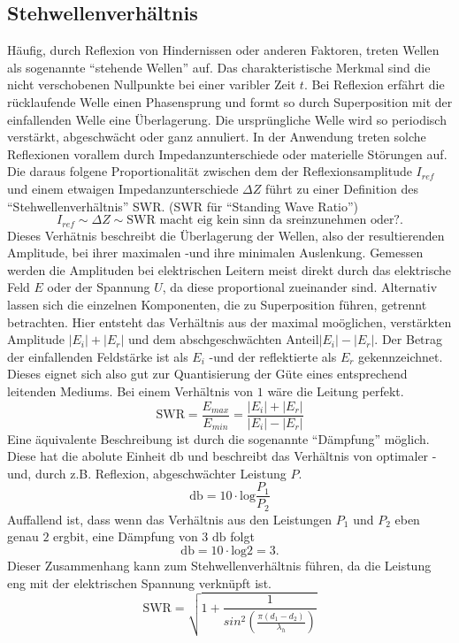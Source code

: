 \subsection{Stehwellenverhältnis}  %
Häufig, durch Reflexion von Hindernissen oder anderen Faktoren, treten Wellen als sogenannte \enquote{stehende Wellen} auf. Das charakteristische Merkmal sind die nicht verschobenen Nullpunkte bei einer varibler Zeit $t$.
Bei Reflexion erfährt die rücklaufende Welle einen Phasensprung und formt so durch Superposition mit der einfallenden Welle eine Überlagerung. Die ursprüngliche Welle wird so periodisch verstärkt, abgeschwächt oder ganz annuliert. 
In der Anwendung treten solche Reflexionen vorallem durch Impedanzunterschiede oder materielle Störungen auf. Die daraus folgene Proportionalität zwischen dem der Reflexionsamplitude $I_{ref}$ und einem etwaigen Impedanzunterschiede $\Delta Z$
führt zu einer Definition des \enquote{Stehwellenverhältnis} SWR. (SWR für \enquote{Standing Wave Ratio}) 
\begin{equation*}
    I_{ref} \sim \Delta Z \sim \text{SWR macht eig kein sinn da sreinzunehmen oder?}.
\end{equation*}
Dieses Verhätnis beschreibt die Überlagerung der Wellen, also der resultierenden Amplitude, bei ihrer maximalen -und ihre minimalen Auslenkung. 
Gemessen werden die Amplituden bei elektrischen Leitern meist direkt durch das elektrische Feld $E$ oder der Spannung $U$, da diese proportional zueinander sind.
Alternativ lassen sich die einzelnen Komponenten, die zu Superposition führen, getrennt betrachten. Hier entsteht das Verhältnis aus der maximal moöglichen, verstärkten Amplitude $|E_i| + |E_r|$ und dem abschgeschwächten Anteil$|E_i| - |E_r|$.
Der Betrag der einfallenden Feldstärke ist als $E_i$ -und der reflektierte als $E_r$ gekennzeichnet. Dieses eignet sich also gut zur Quantisierung der Güte eines entsprechend leitenden Mediums. Bei einem Verhältnis von $1$ wäre die Leitung perfekt.
\begin{equation}
    \text{SWR} = \frac{E_{max}}{E_{min}} =  \frac{|E_i| + |E_r|}{|E_i| - |E_r|}
\end{equation}
Eine äquivalente Beschreibung ist durch die sogenannte \enquote{Dämpfung} möglich. Diese hat die abolute Einheit $\si{\decibel}$ und beschreibt das Verhältnis von optimaler -und, durch z.B. Reflexion, abgeschwächter Leistung $P$. 
\begin{equation}
    \si{\decibel} = 10 \cdot \text{log} \frac{P_1}{P_2}
\end{equation}
Auffallend ist, dass wenn das Verhältnis aus den Leistungen $P_1$ und $P_2$ eben genau $2$ ergbit, eine Dämpfung von 3 $\si{\decibel}$ folgt
\begin{equation*}
    \si{\decibel} = 10 \cdot \text{log} 2 = 3.
\end{equation*}
Dieser Zusammenhang kann zum Stehwellenverhältnis führen, da die Leistung eng mit der elektrischen Spannung verknüpft ist.
\begin{equation}
    \text{SWR} =\sqrt{1 + \frac{1}{ sin^2 \left( \frac{\pi (d_1 - d_2)}{\lambda_h}  \right)} } 
\end{equation}




